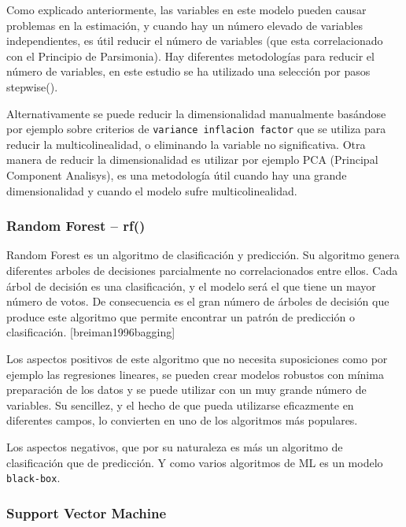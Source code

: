 \documentclass[
]{article}
\begin{document}
Como explicado anteriormente, las variables en este modelo pueden causar
problemas en la estimación, y cuando hay un número elevado de variables
independientes, es útil reducir el número de variables (que esta
correlacionado con el Principio de Parsimonia). Hay diferentes
metodologías para reducir el número de variables, en este estudio se ha
utilizado una selección por pasos stepwise().

Alternativamente se puede reducir la dimensionalidad manualmente
basándose por ejemplo sobre criterios de
\texttt{variance\ inflacion\ factor} que se utiliza para reducir la
multicolinealidad, o eliminando la variable no significativa. Otra
manera de reducir la dimensionalidad es utilizar por ejemplo PCA
(Principal Component Analisys), es una metodología útil cuando hay una
grande dimensionalidad y cuando el modelo sufre multicolinealidad.

\hypertarget{random-forest-rf}{%
\subsubsection{Random Forest -- rf()}\label{random-forest-rf}}

Random Forest es un algoritmo de clasificación y predicción. Su
algoritmo genera diferentes arboles de decisiones parcialmente no
correlacionados entre ellos. Cada árbol de decisión es una
clasificación, y el modelo será el que tiene un mayor número de votos.
De consecuencia es el gran número de árboles de decisión que produce
este algoritmo que permite encontrar un patrón de predicción o
clasificación. {[}breiman1996bagging{]}

Los aspectos positivos de este algoritmo que no necesita suposiciones
como por ejemplo las regresiones lineares, se pueden crear modelos
robustos con mínima preparación de los datos y se puede utilizar con un
muy grande número de variables. Su sencillez, y el hecho de que pueda
utilizarse eficazmente en diferentes campos, lo convierten en uno de los
algoritmos más populares.

Los aspectos negativos, que por su naturaleza es más un algoritmo de
clasificación que de predicción. Y como varios algoritmos de ML es un
modelo \texttt{black-box}.

\hypertarget{support-vector-machine}{%
\subsubsection{Support Vector Machine}\label{support-vector-machine}}
\end{document}

